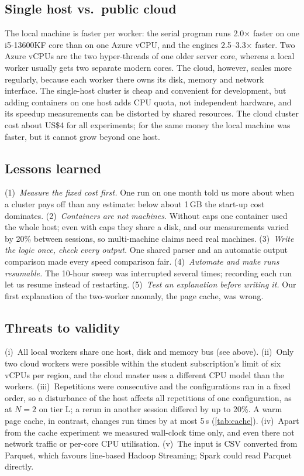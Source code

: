 \subsection{Single host vs.\ public cloud}
The local machine is faster per worker: the serial program runs 2.0$\times$ faster on
one i5-13600KF core than on one Azure vCPU, and the engines 2.5--3.3$\times$ faster.
Two Azure vCPUs are the two hyper-threads of one older server core, whereas a local
worker usually gets two separate modern cores. The cloud, however, scales more
regularly, because each worker there owns its disk, memory and network interface. The
single-host cluster is cheap and convenient for development, but adding containers on
one host adds CPU quota, not independent hardware, and its speedup measurements can be
distorted by shared resources. The cloud cluster cost about US\$4 for all experiments;
for the same money the local machine was faster, but it cannot grow beyond one host.

\subsection{Lessons learned}
(1)~\emph{Measure the fixed cost first.} One run on one month told us more about when
a cluster pays off than any estimate: below about 1\,GB the start-up cost dominates.
(2)~\emph{Containers are not machines.} Without caps one container used the whole host;
even with caps they share a disk, and our measurements varied by 20\% between
sessions, so multi-machine claims need real machines. (3)~\emph{Write the logic once,
check every output.} One shared parser and an automatic output comparison made every
speed comparison fair. (4)~\emph{Automate and make runs resumable.} The 10-hour sweep
was interrupted several times; recording each run let us resume instead of restarting.
(5)~\emph{Test an explanation before writing it.} Our first explanation of the
two-worker anomaly, the page cache, was wrong.

\subsection{Threats to validity}
(i)~All local workers share one host, disk and memory bus (see above). (ii)~Only two
cloud workers were possible within the student subscription's limit of six vCPUs per
region, and the cloud master uses a different CPU model than the workers.
(iii)~Repetitions were consecutive and the configurations ran in a fixed order, so a
disturbance of the host affects all repetitions of one configuration, as at $N=2$ on
tier L; a rerun in another session differed by up to 20\%. A warm page cache, in
contrast, changes run times by at most 5\,s (\cref{tab:cache}). (iv)~Apart from the
cache experiment we measured wall-clock time only, and even there not network
traffic or per-core CPU utilisation. (v)~The input is CSV converted from Parquet,
which favours line-based Hadoop Streaming; Spark could read Parquet directly.
